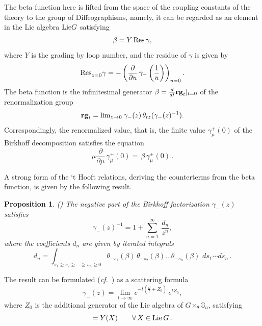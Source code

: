 \documentclass[10pt]{amsart}
\newcommand{\bG}{\mathbb{G}}
\def\b{\beta}
\def\g{\gamma}
\def\t{\theta}
\def\ify{\infty}
\def\ra{\rightarrow}
\def\Lie{{\rm Lie}}
\newcommand{\cf}{{\it cf.\/}\ }
\newtheorem{prop}[thm]{Proposition}
\numberwithin{equation}{section}
\begin{document}
The beta function here is lifted from the space of the coupling
constants of the theory to the group of Diffeographisms, namely, it
can be regarded as an element in the Lie algebra $\Lie G$ satisfying
\begin{equation}\label{beta}
\b = Y \, {\rm Res} \, \g ,
\end{equation}
where $Y$ is the grading by loop number, and the residue of $\gamma$
is given by
\begin{equation}\label{resgamma}
{\rm Res}_{z = 0}^{} \g = - \left( \frac{\partial}{\partial u} \,
  \g_- \left( \frac{1}{u} \right) \right)_{u=0}.
\end{equation}
The beta function is the infinitesimal generator $\b=  \frac{d}{dt}
{\bf rg}_t
|_{t=0}$ of the renormalization group
\begin{equation}\label{rengroup}
{\bf rg}_t ={\rm lim}_{z \ra 0} \:\g_- (z) \, \t_{t z} (\g_-
 (z)^{-1}).
\end{equation}
Correspondingly, the renormalized value, that is, the finite value
$\g_{\mu}^+(0)$ of the Birkhoff
decomposition satisfies the equation
\begin{equation}\label{renaction}
  \mu \frac{\partial}{\partial \mu}
 \,\g^+_{\mu}(0)=\, \b\,\g^+_{\mu}(0)\,.
\end{equation}

\smallskip

A strong form of the `t Hooft relations, deriving the counterterms from the beta
function, is given by the following result.

\begin{prop}\label{thooftrel} {\em (\cite{CK2})}
The negative part of the Birkhoff factorization $\gamma_-(z)$ satisfies
\begin{equation}\label{gammaminussum}
\gamma_-(z)^{-1} = 1 + {\displaystyle
\sum_{n=1}^{\ify}} \ \frac{d_n}{z^n},
\end{equation}
where the coefficients $d_n$ are given by iterated integrals
\begin{equation}\label{dncond}
 d_n = \int_{s_1 \geq s_2 \geq \cdots \geq s_n \geq 0} \t_{-s_1}
(\b) \, \t_{-s_2} (\b) \ldots \t_{-s_n} (\b) \, \, ds_1 \cdots
ds_n \, .
\end{equation}
\end{prop}

The result can be formulated (\cf \cite{CK2}) as a scattering formula
\begin{equation}\label{scattering}
\g_- (z) = \lim_{t \ra \ify}
 e^{-t \left( \frac{\b}{z} + Z_0 \right)} \, e^{t Z_0},
\end{equation}
where $Z_0$ is the additional generator of the Lie algebra of $G
\rtimes_\theta \bG_a$, satisfying
\begin{equation}
 [Z_0 , X] = Y(X) \qquad \forall \, X \in \Lie\, G \, . \label{LieGstar}
\end{equation}
\end{document}

